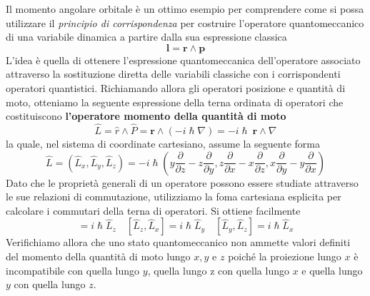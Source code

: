 Il momento angolare orbitale è un ottimo esempio per comprendere come si
possa utilizzare il \emph{principio di corrispondenza} per costruire
l'operatore quantomeccanico di una variabile dinamica a partire dalla
sua espressione classica
\[
    \bm{l}  = \bm{r} \wedge \bm{p}
\]
L'idea è quella di ottenere l'espressione quantomeccanica
dell'operatore associato attraverso la sostituzione diretta delle
variabili classiche con i corrispondenti operatori quantistici.
Richiamando allora gli operatori posizione e quantità di moto, otteniamo
la seguente espressione della terna ordinata di operatori che
costituiscono \textbf{l'operatore momento della quantità di moto}
\begin{equation}
    \hat{L} = \hat{r} \wedge \hat{P}=\bm{r} \wedge (- i \hslash \nabla) = - i \hslash \ \bm{r} \wedge \nabla
    \label{eq:momentum-operator-2}
\end{equation}
la quale, nel sistema di coordinate cartesiano, assume la seguente forma
\begin{equation}
    \hat{L} = (\hat{L}_{x}, \hat{L}_{y}, \hat{L}_{z}) = - i \hslash \left( y \frac{\partial}{\partial z} - z \frac{\partial}{\partial y},z \frac{\partial}{\partial x}-x \frac{\partial}{\partial z}, x \frac{\partial}{\partial y} - y \frac{\partial}{\partial x} \right)
    \label{eq:momentum-operator-cartesian-coordinates}
\end{equation}
Dato che le proprietà generali di un operatore possono essere
studiate attraverso le sue relazioni di commutazione, utilizziamo la
foma cartesiana esplicita per calcolare i commutari della terna di
operatori.
Si ottiene facilmente
\begin{equation}
    [\hat{L}_{x},\hat{L}_{y}] = i \hslash  \hat{L}_{z} \quad
    [\hat{L}_{z},\hat{L}_{x}] = i \hslash  \hat{L}_{y} \quad
    [\hat{L}_{y},\hat{L}_{z}] = i \hslash  \hat{L}_{x}
    \label{eq:commutators-momentum-operator}
\end{equation}
Verifichiamo allora che uno stato quantomeccanico non ammette valori
definiti del momento della quantità di moto lungo \(x, y\) e \(z\)
poiché la proiezione lungo \(x\) è incompatibile con quella lungo \(y\),
quella lungo z con quella lungo \(x\) e quella lungo \(y\) con quella
lungo \(z\).
